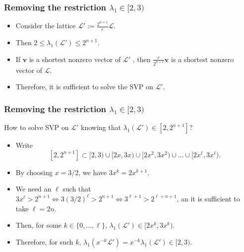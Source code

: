 \documentclass[aspectratio=43]{beamer}
\let\vec\mathbf %
\theoremstyle{remark}
\begin{document}
\begin{frame}
\frametitle{Removing the restriction $\lambda_1 \in [2, 3)$}

\begin{itemize}
\item Consider the lattice $\mathcal{L}' := \frac{2^{n+1}}{e}\mathcal{L}$.

\item Then $2 \le \lambda_1\left(\mathcal{L}'\right) \le 2^{n+1}.$

\item If $\vec v$ is a shortest nonzero vector of $\mathcal{L}'$ , then 
$\frac{e}{2^{n+1}} \vec v$ is a shortest nonzero vector of $\mathcal{L}$. 

\item Therefore, it is sufficient to solve the SVP on $\mathcal{L}'$.

\end{itemize}

\end{frame}


\begin{frame}
\frametitle{Removing the restriction $\lambda_1 \in [2, 3)$}

How to solve SVP on $\mathcal{L}'$ knowing that $\lambda_1(\mathcal{L}') \in 
[2, 2^{n+1}]$?

\begin{itemize}
\item Write
$$[2, 2^{n+1}] \subset [2, 3) \cup [2x, 3x) \cup [2x^2, 3x^2) \cup ... \cup 
[2x^\ell, 3x^\ell).$$

\item By choosing $x = 3/2$, we have $3x^k = 2x^{k+1}$.

\item We need an $\ell$ such that $3x^\ell > 2^{n+1} \Leftrightarrow 
3(3/2)^\ell > 2^{n+1} \Leftrightarrow 3^{\ell+1} > 2^{\ell + n+1}$, an it is 
sufficient to take $\ell = 2n$.

\item Then, for some $k \in \{0, ..., \ell\}$, $\lambda_1(\mathcal{L}') \in 
[2x^k, 3x^k)$.

\item Therefore, for such $k$, $\lambda_1(x^{-k}\mathcal{L}') = 
x^{-k}\lambda_1(\mathcal{L}') \in [2, 3)$.
\end{itemize}
\end{frame}
\end{document}
